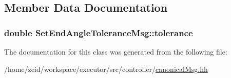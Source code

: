 \subsection{Member Data Documentation}
\hypertarget{class_set_end_angle_tolerance_msg_a70635df975e1602240840236546fa9aa}{
\subsubsection[{tolerance}]{\setlength{\rightskip}{0pt plus 5cm}double {\bf SetEndAngleToleranceMsg::tolerance}}}
\label{class_set_end_angle_tolerance_msg_a70635df975e1602240840236546fa9aa}


The documentation for this class was generated from the following file:\begin{DoxyCompactItemize}
\item 
/home/zeid/workspace/executor/src/controller/\hyperlink{canonical_msg_8hh}{canonicalMsg.hh}\end{DoxyCompactItemize}
